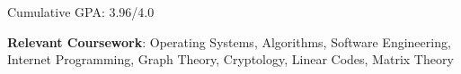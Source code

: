 
Cumulative GPA: 3.96/4.0

\vspace{0.2cm}


\divider

\textbf{Relevant Coursework}: Operating Systems, Algorithms, Software Engineering, Internet Programming, Graph Theory, 
Cryptology, Linear Codes, Matrix Theory

